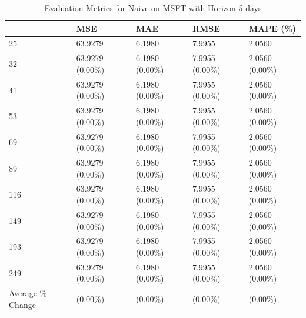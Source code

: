 \begin{table}
\caption{Evaluation Metrics for Naive on MSFT with Horizon 5 days}
\label{tab:naive_MSFT_h5_metrics}
\begin{tabular}{lllll}
\toprule
 & MSE & MAE & RMSE & MAPE (\%) \\
\midrule
25 & 63.9279 & 6.1980 & 7.9955 & 2.0560 \\
32 & 63.9279 (0.00\%) & 6.1980 (0.00\%) & 7.9955 (0.00\%) & 2.0560 (0.00\%) \\
41 & 63.9279 (0.00\%) & 6.1980 (0.00\%) & 7.9955 (0.00\%) & 2.0560 (0.00\%) \\
53 & 63.9279 (0.00\%) & 6.1980 (0.00\%) & 7.9955 (0.00\%) & 2.0560 (0.00\%) \\
69 & 63.9279 (0.00\%) & 6.1980 (0.00\%) & 7.9955 (0.00\%) & 2.0560 (0.00\%) \\
89 & 63.9279 (0.00\%) & 6.1980 (0.00\%) & 7.9955 (0.00\%) & 2.0560 (0.00\%) \\
116 & 63.9279 (0.00\%) & 6.1980 (0.00\%) & 7.9955 (0.00\%) & 2.0560 (0.00\%) \\
149 & 63.9279 (0.00\%) & 6.1980 (0.00\%) & 7.9955 (0.00\%) & 2.0560 (0.00\%) \\
193 & 63.9279 (0.00\%) & 6.1980 (0.00\%) & 7.9955 (0.00\%) & 2.0560 (0.00\%) \\
249 & 63.9279 (0.00\%) & 6.1980 (0.00\%) & 7.9955 (0.00\%) & 2.0560 (0.00\%) \\
Average \% Change & (0.00\%) & (0.00\%) & (0.00\%) & (0.00\%) \\
\bottomrule
\end{tabular}
\end{table}
